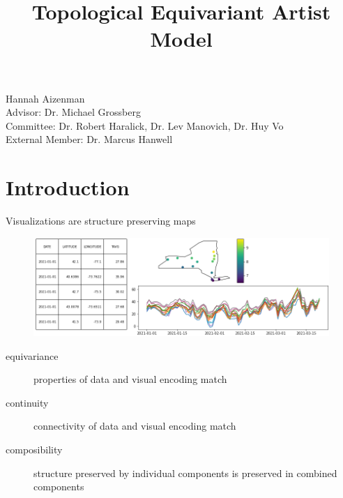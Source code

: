 \documentclass[xcolor={dvipsnames}, handout]{beamer}
\begin{document}
\title{Topological Equivariant Artist Model}

\begin{frame}
	\titlepage
    Hannah Aizenman\\
    Advisor: Dr. Michael Grossberg \\
    Committee: Dr. Robert Haralick, Dr. Lev Manovich, Dr. Huy Vo\\
    External Member: Dr. Marcus Hanwell
\end{frame}

\section{Introduction}

\begin{frame}{Visualizations are structure preserving maps}
    \begin{figure}
        \includegraphics[width=\textwidth]{figures/intro/viz_same.png}
    \end{figure}
    \begin{description}
        \item[equivariance] properties of data and visual encoding match
        \item[continuity] connectivity of data and visual encoding match
        \item[composibility] structure preserved by individual components is preserved in combined components
    \end{description}
\end{frame}
\end{document}
